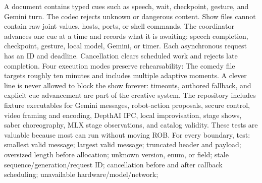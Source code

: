 {}A  document contains typed cues such as speech, wait, checkpoint, gesture, and Gemini turn. The codec rejects unknown or dangerous content. Show files cannot contain raw joint values, hosts, ports, or shell commands.\markdownRendererParagraphSeparator
{}The coordinator advances one cue at a time and records what it is awaiting: speech completion, checkpoint, gesture, local model, Gemini, or timer. Each asynchronous request has an ID and deadline. Cancellation clears scheduled work and rejects late completion.\markdownRendererParagraphSeparator
{}Four execution modes preserve rehearsability:\markdownRendererInterblockSeparator
{}\markdownRendererInterblockSeparator
{}The comedy file targets roughly ten minutes and includes multiple adaptive moments. A clever line is never allowed to block the show forever: timeouts, authored fallback, and explicit cue advancement are part of the creative system.\markdownRendererInterblockSeparator
{}
\markdownRendererSectionEnd \markdownRendererSectionBegin
{}\markdownRendererInterblockSeparator
{}The repository includes fixture executables for Gemini messages, robot-action proposals, secure control, video framing and encoding, DepthAI IPC, local improvisation, stage shows, saber choreography, MLX stage observations, and catalog validity. These tests are valuable because most can run without moving ROB.\markdownRendererParagraphSeparator
{}For every boundary, test:\markdownRendererInterblockSeparator
{}\markdownRendererOlBegin
{}smallest valid message;\markdownRendererOlItemEnd 
{}largest valid message;\markdownRendererOlItemEnd 
{}truncated header and payload;\markdownRendererOlItemEnd 
{}oversized length before allocation;\markdownRendererOlItemEnd 
{}unknown version, enum, or field;\markdownRendererOlItemEnd 
{}stale sequence/generation/request ID;\markdownRendererOlItemEnd 
{}cancellation before and after callback scheduling;\markdownRendererOlItemEnd 
{}unavailable hardware/model/network;\markdownRendererOlItemEnd 
